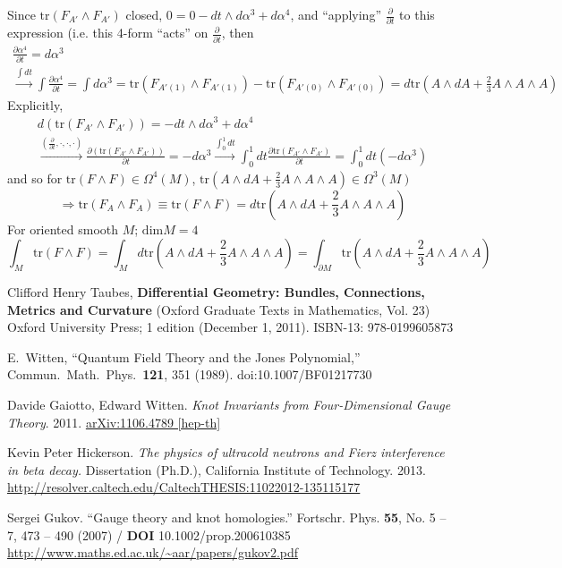 \documentclass[10pt]{amsart}
\begin{document}
Since $\text{tr}(F_{A'} \wedge F_{A'})$ closed, $0 = 0 - dt \wedge d\alpha^3 + d\alpha^4$, and ``applying'' $\frac{ \partial }{ \partial t}$ to this expression (i.e. this 4-form ``acts'' on $\frac{ \partial }{ \partial t}$, then 
\[
\begin{gathered}
  \frac{ \partial \alpha^4}{ \partial t} = d\alpha^3 \\ 
\xrightarrow{ \int dt } \int \frac{ \partial \alpha^4}{ \partial t} = \int d\alpha^3 = \text{tr}(F_{A'(1)} \wedge F_{A'(1)} ) - \text{tr}(F_{A'(0)} \wedge F_{A'(0) } ) = d\text{tr}(A\wedge dA + \frac{2}{3} A \wedge A \wedge A)
\end{gathered}
\]
Explicitly,
\[
\begin{gathered}
  d(\text{tr}(F_{A'} \wedge F_{A'}) ) = -dt \wedge d\alpha^3 + d\alpha^4 \\ 
  \xrightarrow{ \left( \frac{ \partial }{ \partial t} , \cdot, \cdot, \cdot \right) } \frac{ \partial ( \text{tr}(F_{A'} \wedge F_{A'} ) ) }{ \partial t} = - d\alpha^3 \xrightarrow{ \int_0^1 dt } \int_0^1 dt \frac{ \partial \text{tr}( F_{A'} \wedge F_{A'})}{ \partial t} = \int_0^1 dt ( -d\alpha^3)
\end{gathered}
\]
and so for $\text{tr}(F\wedge F) \in \Omega^4(M)$, $\text{tr}(A \wedge dA + \frac{2}{3} A \wedge A \wedge A) \in \Omega^3(M)$
\[
\Longrightarrow \text{tr}(F_A \wedge F_A) \equiv \text{tr}(F\wedge F) = d\text{tr}(A \wedge dA + \frac{2}{3} A \wedge A \wedge A )
\]
For oriented smooth $M$; $\text{dim}M=4$
\[
\int_M \text{tr}(F\wedge F)= \int_M d\text{tr}(A \wedge dA + \frac{2}{3} A \wedge A \wedge A ) = \int_{\partial M} \text{tr}(A \wedge dA + \frac{2}{3} A \wedge A \wedge A)
\]



\begin{thebibliography}{9}

Clifford Henry Taubes, \textbf{Differential Geometry: Bundles, Connections, Metrics and Curvature} (Oxford Graduate Texts in Mathematics, Vol. 23) Oxford University Press; 1 edition (December 1, 2011). ISBN-13: 978-0199605873


  E.~Witten,
  ``Quantum Field Theory and the Jones Polynomial,''
  Commun.\ Math.\ Phys.\  {\bf 121}, 351 (1989).
  doi:10.1007/BF01217730


Davide Gaiotto, Edward Witten. \emph{Knot Invariants from Four-Dimensional Gauge Theory}. 2011.   \href{http://arxiv.org/abs/1106.4789}{arXiv:1106.4789 [hep-th]}


Kevin Peter Hickerson.  \emph{The physics of ultracold neutrons and Fierz interference in beta decay.}  Dissertation (Ph.D.), California Institute of Technology. 2013.  \url{http://resolver.caltech.edu/CaltechTHESIS:11022012-135115177}


Sergei Gukov.  ``Gauge theory and knot homologies.''  Fortschr. Phys. \textbf{55}, No. 5 – 7, 473 – 490 (2007) / \textbf{DOI} 10.1002/prop.200610385  \url{http://www.maths.ed.ac.uk/~aar/papers/gukov2.pdf}


\end{thebibliography}
\end{document}
